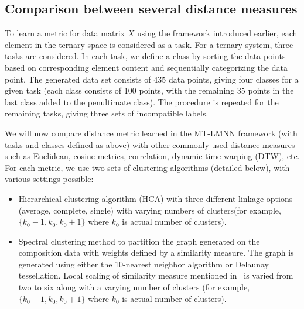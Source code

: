\subsection{Comparison between several distance measures}
To learn a metric for data matrix $X$ using the framework introduced earlier, each element in the ternary space is considered as a task. 
For a ternary system, three tasks are considered. 
In each task, we define a class by sorting the data points based on corresponding element content and sequentially categorizing the data point.
The generated data set consists of 435 data points, giving four classes for a given task (each class consists of 100 points, with the remaining 35 points in the last class added to the penultimate class).
The procedure is repeated for the remaining tasks, giving three sets of incompatible labels.

We will now compare distance metric learned in the MT-LMNN framework (with tasks and classes defined as above) with other commonly used distance measures such as Euclidean, cosine metrics, correlation, dynamic time warping (DTW), etc. 
For each metric, we use two sets of clustering algorithms (detailed below), with various settings possible:
\begin{itemize}
    \item Hierarchical clustering algorithm (HCA) with three different linkage options (average, complete, single) with varying numbers of clusters(for example,~\(\{k_0-1,k_0,k_0+1\}\) where $k_0$ is actual number of clusters).
    \item  Spectral clustering method\cite{ng2002spectral,zelnik2005self} to partition the graph generated on the composition data with weights defined by a similarity measure. The graph is generated using either the 10-nearest neighbor algorithm or Delaunay tessellation. Local scaling of similarity measure mentioned in~\cite{zelnik2005self} is varied from two to six along with a varying number of clusters (for example,~\(\{k_0-1,k_0,k_0+1\}\) where $k_0$ is actual number of clusters).
\end{itemize}

